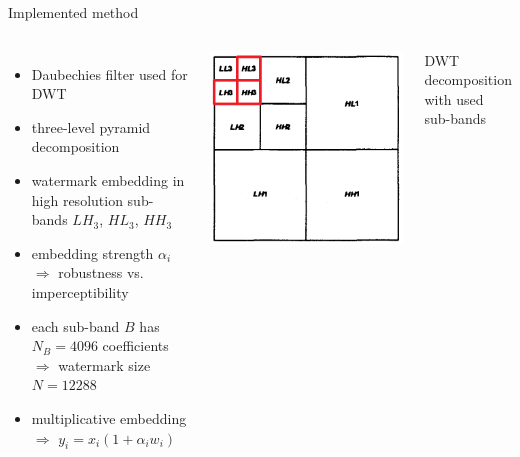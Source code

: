 \begin{frame}{\insertsection}{Implemented method}
	\begin{columns}[T]
	\begin{itemize}
	\item Daubechies filter used for DWT
	\item three-level pyramid decomposition
	\item watermark embedding in high resolution sub-bands $LH_3$, $HL_3$, $HH_3$ 
	\item embedding strength $\alpha_i$
	\newline \textcolor{TUDblue}{$\Rightarrow$} robustness vs. imperceptibility %
	\item each sub-band $B$ has $N_B = 4096$ coefficients 
	\newline \textcolor{TUDblue}{$\Rightarrow$} watermark size $N = 12288$
	\item multiplicative embedding	
	\newline \textcolor{TUDblue}{$\Rightarrow$} $y_i = x_i(1+\alpha_iw_i)$
	\end{itemize}
	\centering
	\includegraphics[width=.8\textwidth]{Bilder/threelayerMotivationPainted} 
	
	DWT decomposition with used sub-bands 
	\end{columns} 	
\end{frame}


